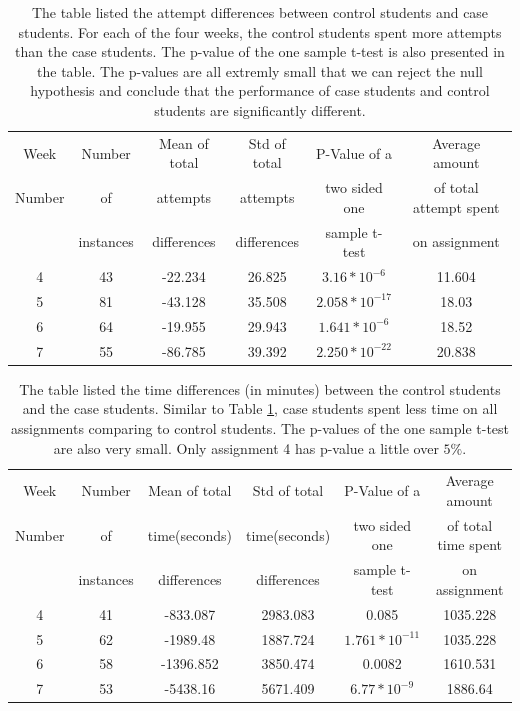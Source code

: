 \documentclass{llncs2e/llncs}
\begin{document}
\begin{table}[th]
\caption{The table listed the attempt differences between control students and case students. For each of the four weeks, the control students spent more attempts than the case students. The p-value of the one sample t-test is also presented in the table. The p-values are all extremly small that we can reject the null hypothesis and conclude that the performance of case students and control students are significantly different.}
\begin{center}
  \begin{tabular}{| c | c | c | c | c | c |}
  \hline
    Week & Number& Mean of total & Std of total &  P-Value of a &Average amount \\
    Number & of & attempts & attempts & two sided one & of total attempt spent\\
     & instances & differences & differences & sample t-test & on assignment   \\ \hline
	4 & 43 & -22.234 & 26.825 & $3.16 * 10^{-6}$ & 11.604\\
	5 & 81 & -43.128 & 35.508 & $2.058 * 10 ^{-17}$ & 18.03\\
	6 & 64 & -19.955 & 29.943 & $1.641 * 10^{-6}$ &  18.52\\
	7 & 55 & -86.785 & 39.392 & $2.250 * 10^{-22}$ & 20.838\\
	\hline
  \end{tabular}
  \label{tab:no_hint}
  \end{center}
\end{table}

\begin{table}
\caption{The table listed the time differences (in minutes) between the control students and the case students. Similar to Table \ref{tab:no_hint}, case students spent less time on all assignments comparing to control students. The p-values of the one sample t-test are also very small. Only assignment 4 has p-value a little over $5\%$.}
\begin{center}
  \begin{tabular}{| c | c | c | c | c | c |}
    \hline
    Week & Number& Mean of total & Std of total &  P-Value of a &Average amount \\
    Number & of & time(seconds) & time(seconds) & two sided one & of total time spent\\
     & instances & differences & differences & sample t-test & on assignment   \\ \hline
	4 & 41 & -833.087 & 2983.083 & 0.085 & 1035.228\\
	5 & 62 & -1989.48 &1887.724 & $1.761 * 10^{-11}$ & 1035.228\\
	6 & 58 & -1396.852 & 3850.474 & 0.0082 & 1610.531 \\
	7 & 53 & -5438.16 & 5671.409 & $6.77 * 10^{-9}$ & 1886.64\\
	\hline
  \end{tabular}
  \label{tab:no_hint_time}
  \end{center}
\end{table}
\end{document}
